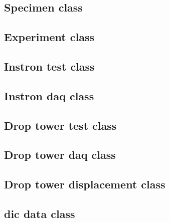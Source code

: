 \subsection{Specimen class}


\subsection{Experiment class}


\subsection{Instron test class}


\subsection{Instron \acs*{daq} class}


\subsection{Drop tower test class}


\subsection{Drop tower \acs*{daq} class}


\subsection{Drop tower displacement class }


\subsection{\acs*{dic} data class}
